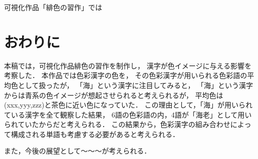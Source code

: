 \documentclass[a4j,twocolumn]{ujarticle} %
\newcommand{\workname}{緋色の習作}
\newcommand{\colorname}{色彩語}
\newcommand{\colorkanji}{色彩漢字}
\newcommand{\recallcolor}{色イメージ}
\begin{document}
可視化作品「\workname{}」では

\section{おわりに}

本稿では，可視化作品\workname{}を制作し，
漢字が\recallcolor{}に与える影響を考察した．
本作品では\colorkanji{}の色を，
その\colorkanji{}が用いられる\colorname{}の平均色として扱ったが，
「海」という漢字に注目してみると，
「海」という漢字からは青系の\recallcolor{}が想起させられると考えられるが，
平均色は(xxx,yyy,zzz)と茶色に近い色になっていた．
この理由として，「海」が用いられている漢字を全て観察した結果，
6語の\colorname{}の内，4語が「海老」として用いられていたからだと考えられる．
この結果から，\colorkanji{}の組み合わせによって構成される単語も考慮する必要があると考えられる．

また，今後の展望として〜〜〜が考えられる．




\end{document}
